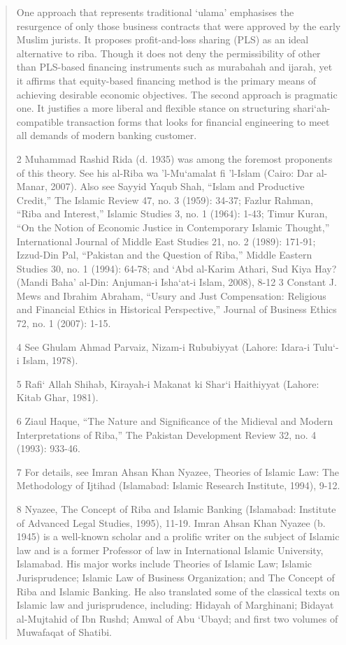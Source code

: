 \begin{quote}
One approach that represents traditional ‘ulama' emphasises the resurgence of only those business contracts that were approved by the early Muslim jurists. It proposes profit-and-loss sharing (PLS) as an ideal alternative to riba. Though it does not deny the permissibility of other than PLS-based financing instruments such as murabahah and ijarah, yet it affirms that equity-based financing method is the primary means of achieving desirable economic objectives. The second approach is pragmatic one. It justifies a more liberal and flexible stance on structuring shari‘ah-compatible transaction forms that looks for financial engineering to meet all demands of modern banking customer.

2 Muhammad Rashid Rida (d. 1935) was among the foremost proponents of this theory. See his al-Riba wa 'l-Mu‘amalat fi 'l-Islam (Cairo: Dar al-Manar, 2007). Also see Sayyid Yaqub Shah, “Islam and Productive Credit,” The Islamic Review 47, no. 3 (1959): 34-37; Fazlur Rahman, “Riba and Interest,” Islamic Studies 3, no. 1 (1964): 1-43; Timur Kuran, “On the Notion of Economic Justice in Contemporary Islamic Thought,” International Journal of Middle East Studies 21, no. 2 (1989): 171-91; Izzud-Din Pal, “Pakistan and the Question of Riba,” Middle Eastern Studies 30, no. 1 (1994): 64-78; and ‘Abd al-Karim Athari, Sud Kiya Hay? (Mandi Baha' al-Din: Anjuman-i Isha‘at-i Islam, 2008), 8-12 3 Constant J. Mews and Ibrahim Abraham, “Usury and Just Compensation: Religious and Financial Ethics in Historical Perspective,” Journal of Business Ethics 72, no. 1 (2007): 1-15.

4 See Ghulam Ahmad Parvaiz, Nizam-i Rububiyyat (Lahore: Idara-i Tulu‘-i Islam, 1978).

5 Rafi‘ Allah Shihab, Kirayah-i Makanat ki Shar‘i Haithiyyat (Lahore: Kitab Ghar, 1981).

6 Ziaul Haque, “The Nature and Significance of the Midieval and Modern Interpretations of Riba,” The Pakistan Development Review 32, no. 4 (1993): 933-46.

7 For details, see Imran Ahsan Khan Nyazee, Theories of Islamic Law: The Methodology of Ijtihad (Islamabad: Islamic Research Institute, 1994), 9-12.

8 Nyazee, The Concept of Riba and Islamic Banking (Islamabad: Institute of Advanced Legal Studies, 1995), 11-19. Imran Ahsan Khan Nyazee (b. 1945) is a well-known scholar and a prolific writer on the subject of Islamic law and is a former Professor of law in International Islamic University, Islamabad. His major works include Theories of Islamic Law; Islamic Jurisprudence; Islamic Law of Business Organization; and The Concept of Riba and Islamic Banking. He also translated some of the classical texts on Islamic law and jurisprudence, including: Hidayah of Marghinani; Bidayat al-Mujtahid of Ibn Rushd; Amwal of Abu ‘Ubayd; and first two volumes of Muwafaqat of Shatibi.


\end{quote}
